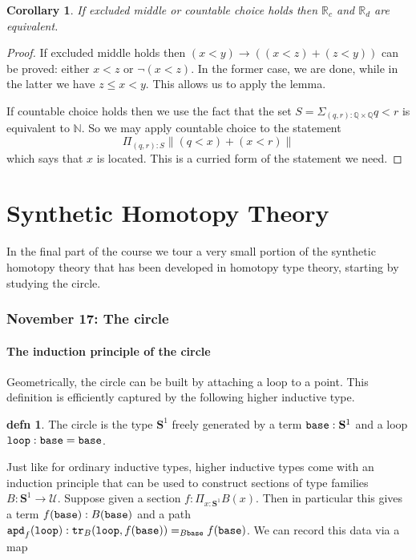 \documentclass{amsart}
\theoremstyle{theorem}
\newtheorem*{cor}{Corollary}
\theoremstyle{definition}
\newtheorem*{defn}{defn}
\theoremstyle{remark}
\newcommand{\0}{\mathbbe{0}}
\newcommand{\1}{\mathbbe{1}}
\newcommand{\2}{\mathbbe{2}}
\newcommand{\3}{\mathbbe{3}}
\newcommand{\4}{\mathbbe{4}}
\newcommand{\NN}{\mathbb{N}}
\newcommand{\QQ}{\mathbb{Q}}
\newcommand{\RR}{\mathbb{R}}
\newcommand{\term}[1]{{\textup{\texttt{#1}}}}
\newcommand{\tr}{\term{tr}}
\newcommand{\apd}{\term{apd}}
\newcommand{\UU}{{\mathcal{U}}}
\newcommand{\mere}[1]{\|{#1}\|}
\newcommand{\Sone}{\mathbf{S}^1}
\newcommand{\base}{\term{base}}
\newcommand{\lloop}{\term{loop}}
\begin{document}
\begin{cor} If excluded middle or countable choice holds then $\RR_c$ and $\RR_d$ are equivalent.
\end{cor}
\begin{proof}
If excluded middle holds then $(x<y) \to ((x<z)+ (z<y))$ can be proved: either $x < z$ or $\neg (x<z)$. In the former case, we are done, while in the latter we have $z  \leq x < y$. This allows us to apply the lemma.

If countable choice holds then we use the fact that the set $S = \Sigma_{(q,r): \QQ \times \QQ} q < r$ is equivalent to $\NN$. So we may apply countable choice to the statement 
\[ \Pi_{(q,r) : S} \mere{(q<x) + (x<r)}\]
which says that $x$ is located. This is a curried form of the statement we need.
\end{proof}




\part{Synthetic Homotopy Theory}

In the final part of the course we tour a very small portion of the synthetic homotopy theory that has been developed in homotopy type theory, starting by studying the circle.

\section*{November 17: The circle}

\subsection*{The induction principle of the circle}

Geometrically, the circle can be built by attaching a loop to a point. This definition is efficiently captured by the following higher inductive type.

\begin{defn} The circle is the type $\Sone$ freely generated by a term $\base : \Sone$ and a loop $\lloop : \base = \base$.
\end{defn}

Just like for ordinary inductive types, higher inductive types come with an induction principle that can be used to construct sections of type families $B : \Sone \to \UU$. Suppose given a section $f : \Pi_{x : \Sone} B(x)$. Then in particular this gives a term $f(\base) : B(\base)$ and a path $\apd_f( \lloop) : \tr_B(\lloop, f(\base)) =_{B\base} f(\base)$. We can record this data via a map
\end{document}
